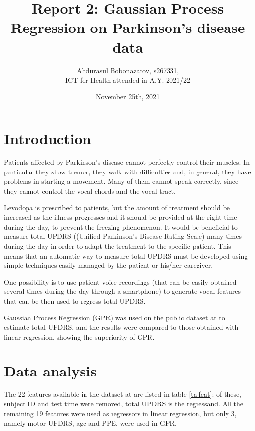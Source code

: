 \documentclass[12pt]{article}
\title{Report 2:
Gaussian Process Regression on Parkinson's disease data}
\author{Abdurasul Bobonazarov, s267331, \\ICT for Health attended in A.Y. 2021/22}
\date{November 25th, 2021}
\begin{document}
\maketitle
\section{Introduction}
Patients affected by Parkinson’s disease cannot perfectly control their
muscles. In particular they show tremor, they walk with difficulties and,
in general, they have problems in starting a movement. Many of them
cannot speak correctly, since they cannot control the vocal chords and
the vocal tract. 

Levodopa is prescribed to patients, but the amount of treatment should be increased as the illness progresses and it should be provided at the right time during the day, to prevent the freezing phenomenon. It would be beneficial to measure total UPDRS ((Unified Parkinson’s Disease Rating Scale) many times during the day in order to adapt the treatment to the specific patient. This means that an automatic way to measure total UPDRS must be developed using simple techniques easily managed by the patient or his/her caregiver.

One possibility is to use patient voice recordings (that can be easily obtained several times during the day through a smartphone) to generate vocal features that can be then used to regress total UPDRS.

Gaussian Process Regression (GPR) was used on the public dataset at \cite{UCI} to estimate total UPDRS, and the results were compared to those obtained with linear regression, showing the superiority of GPR. 

\section{Data analysis}
The 22 features available in the dataset at \cite{UCI} are listed in table \ref{ta:feat}: of these, subject ID and test time were removed, total UPDRS is the regressand. All the remaining 19 features were used as regressors in linear regression, but only 3, namely motor UPDRS, age and PPE, were used in GPR.
\end{document}
